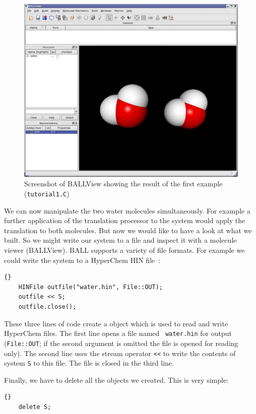 \begin{figure}[t]
	\centering
	\includegraphics[width=\textwidth]{tut1_screenshot}
	\caption{Screenshot of BALLView showing the result of the first example
					 ({\tt tutorial1.C})}
	\label{fig:tut1-screenshot}
\end{figure}
\noindent
We can now manipulate the two water molecules simultaneously. For example a
further application of the translation processor to the system would apply
the translation to both molecules.
But now we would like to have a look at what we built. So we might write our
system to a file and inspect it with a molecule viewer (\eg BALLView).
BALL supports a variety of file formats. For example we could write the system
to a HyperChem HIN file~\cite{HyperChem}:
\begin{lstlisting}{}
	HINFile outfile("water.hin", File::OUT);
	outfile << S;
	outfile.close();
\end{lstlisting}
\noindent
These three lines of code create a  object which is used to
read and write HyperChem files. The first line opens a file named {\tt
water.hin} for output ({\tt File::OUT}; if the second argument is omitted the
file is opened for reading only).
The second line uses the stream operator {\tt <<} to write the contents
of system {\tt S} to this file. The file is closed in the third line.

Finally, we have to delete all the objects we created. This is very simple:

\begin{lstlisting}{}
	delete S;
\end{lstlisting}

